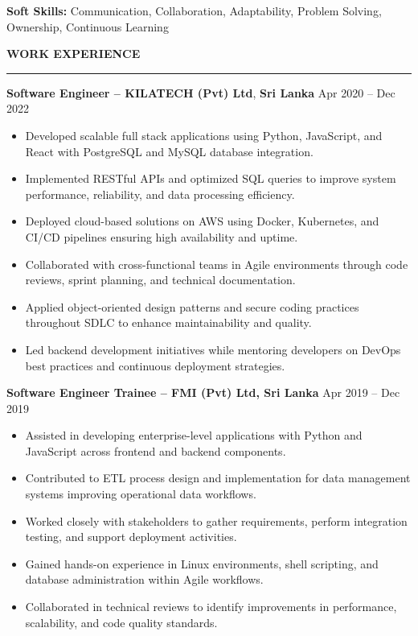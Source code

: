 \documentclass[10pt,letterpaper]{article}
\begin{document}
\textbf{Soft Skills:} Communication, Collaboration, Adaptability, Problem Solving, Ownership, Continuous Learning

\vspace{8pt}

\textbf{WORK EXPERIENCE}\\[-8pt]
\noindent\rule{\textwidth}{1pt}

\vspace{-2pt}

\textbf{Software Engineer -- KILATECH (Pvt) Ltd}, \textbf{Sri Lanka} \hfill Apr 2020 -- Dec 2022

\vspace{-1pt}

\begin{itemize}
\item Developed scalable full stack applications using Python, JavaScript, and React with PostgreSQL and MySQL database integration.
\item Implemented RESTful APIs and optimized SQL queries to improve system performance, reliability, and data processing efficiency.
\item Deployed cloud-based solutions on AWS using Docker, Kubernetes, and CI/CD pipelines ensuring high availability and uptime.
\item Collaborated with cross-functional teams in Agile environments through code reviews, sprint planning, and technical documentation.
\item Applied object-oriented design patterns and secure coding practices throughout SDLC to enhance maintainability and quality.
\item Led backend development initiatives while mentoring developers on DevOps best practices and continuous deployment strategies.
\end{itemize}

\textbf{Software Engineer Trainee -- FMI (Pvt) Ltd, Sri Lanka} \hfill Apr 2019 -- Dec 2019

\vspace{-1pt}

\begin{itemize}
\item Assisted in developing enterprise-level applications with Python and JavaScript across frontend and backend components.
\item Contributed to ETL process design and implementation for data management systems improving operational data workflows.
\item Worked closely with stakeholders to gather requirements, perform integration testing, and support deployment activities.
\item Gained hands-on experience in Linux environments, shell scripting, and database administration within Agile workflows.
\item Collaborated in technical reviews to identify improvements in performance, scalability, and code quality standards.
\end{itemize}
\end{document}
